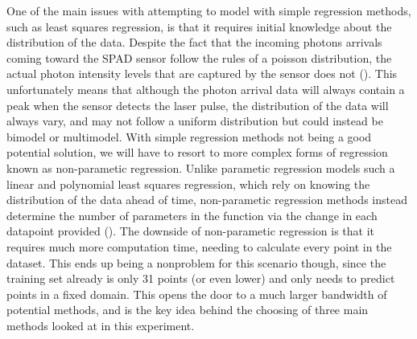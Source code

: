\documentclass[letterpaper,12pt]{article}
\begin{document}
One of the main issues with attempting to model with simple regression methods, such as 
least squares regression, is that it requires initial knowledge about the distribution of
the data. Despite the fact that the incoming photons arrivals coming toward the SPAD sensor 
follow the rules of a poisson distribution, the actual photon intensity levels that are captured 
by the sensor does not (\cite{ingle2019high}). This unfortunately means that although the 
photon arrival data will always contain a peak when the sensor detects the laser pulse, the
distribution of the data will always vary, and may not follow a uniform distribution but
could instead be bimodel or multimodel. With simple regression methods not being a good 
potential solution, we will have to resort to more complex forms of regression known
as non-parametic regression. Unlike parametic regression models such a linear and polynomial
least squares regression, which rely on knowing the distribution of the data ahead of time,
non-parametic regression methods instead determine the number of parameters in the function
via the change in each datapoint provided (\cite{mahoud2019parametic}). The downside of 
non-parametic regression is that it requires much more computation time, needing to calculate
every point in the dataset. This ends up being a nonproblem for this scenario though,
since the training set already is only 31 points (or even lower) and only needs to predict
points in a fixed domain. This opens the door to a much larger bandwidth of potential methods, 
and is the key idea behind the choosing of three main methods looked at in this experiment.
\end{document}
